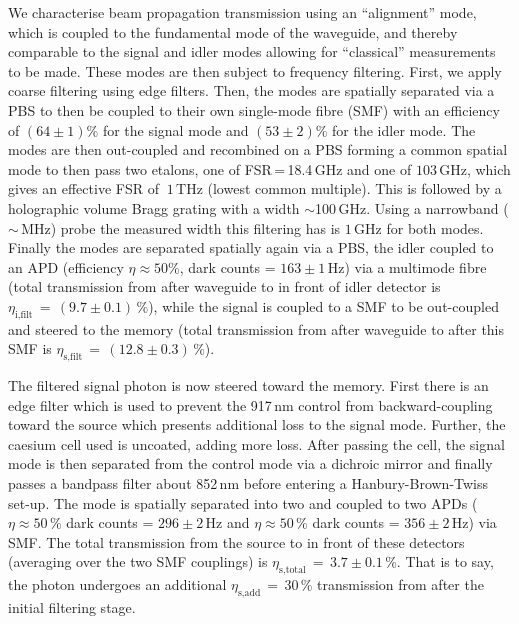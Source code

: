 We characterise beam propagation transmission using an ``alignment'' mode, which is coupled to the fundamental mode of the waveguide, and thereby comparable to the signal and idler modes allowing for ``classical'' measurements to be made. These modes are then subject to frequency filtering. First, we apply coarse filtering using edge filters. Then, the modes are spatially separated via a PBS to then be coupled to their own single-mode fibre (SMF) with an efficiency of $(64 \pm 1)\%$ for the signal mode and $(53 \pm 2)\%$ for the idler mode. The modes are then out-coupled and recombined on a PBS forming a common spatial mode to then pass two etalons, one of FSR$\,$=$\,$18.4$\,$GHz and one of $103\,$GHz, which gives an effective FSR of $~1\,$THz (lowest common multiple). This is followed by a holographic volume Bragg grating with a width $\sim$100$\,$GHz. Using a narrowband ($\sim\,$MHz) probe the measured width this filtering has is $1\,$GHz for both modes. Finally the modes are separated spatially again via a PBS, the idler coupled to an APD (efficiency $\eta \approx 50\%$, dark counts = $163\pm 1\,$Hz) via a multimode fibre (total transmission from after waveguide to in front of idler detector is $\eta_\textrm{i,filt}\,=\,(9.7\pm0.1)\,\%$), while the signal is coupled to a SMF to be out-coupled and steered to the memory (total transmission from after waveguide to after this SMF is $\eta_\textrm{s,filt}\,=\,(12.8 \pm 0.3)\,\%$). 

The filtered signal photon is now steered toward the memory. First there is an edge filter which is used to prevent the 917$\,$nm control from backward-coupling toward the source which presents additional loss to the signal mode. Further, the caesium cell used is uncoated, adding more loss. After passing the cell, the signal mode is then separated from the control mode via a dichroic mirror and finally passes a bandpass filter about 852$\,$nm before entering a Hanbury-Brown-Twiss set-up. The mode is spatially separated into two and coupled to two APDs ($\eta\approx50\,\%$ dark counts = $296 \pm 2\,$Hz and $\eta\approx50\,\%$ dark counts = $356 \pm 2\,$Hz) via SMF. The total transmission from the source to in front of these detectors (averaging over the two SMF couplings) is $\eta_\textrm{s,total}\,=\,3.7\pm0.1\,\%$. That is to say, the photon undergoes an additional $\eta_\textrm{s,add}\,=\,30\,\%$ transmission from after the initial filtering stage.

